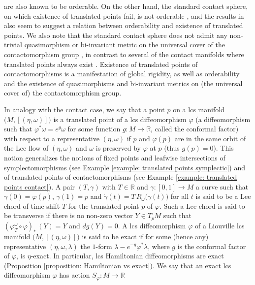 \documentclass{amsart}
\theoremstyle{remark}
\begin{document}
are also known to be orderable.
On the other hand,
the standard contact sphere,
on which existence of translated points fail,
is not orderable \cite{EKP},
and the results in \cite{HS, AArl}
also seem to suggest a relation between orderability
and existence of translated points.
We also note that the standard contact sphere
does not admit any non-trivial quasimorphism
or bi-invariant metric on the universal cover
of the contactomorphism group \cite{FPR},
in contrast to several of the contact manifolds
where translated points always exist
\cite{San10, CS, Givental, GKPS, FPR, BZ}.
Existence of translated points of contactomorphisms
is a manifestation of global rigidity,
as well as orderability and the existence of quasimorphisms
and bi-invariant metrics on (the universal cover of) the contactomorphism group.

In analogy with the contact case,
we say that a point $p$ on a lcs manifold $\big( M , [(\eta, \omega)] \big)$
is a translated point of a lcs diffeomorphism $\varphi$
(a diffeomorphism such that $\varphi^{\ast}\omega = e^g \omega$
for some function $g: M \rightarrow \mathbb{R}$,
called the conformal factor)
with respect to a representative $(\eta, \omega)$
if $p$ and $\varphi(p)$ are in the same orbit
of the Lee flow of $(\eta, \omega)$
and $\omega$ is preserved by $\varphi$ at $p$
(thus $g(p) = 0$).
This notion generalizes the notions of fixed points
and leafwise intersections of symplectomorphisms
(see Example \ref{example: translated points symplectic})
and of translated points of contactomorphisms
(see Example \ref{example: translated points contact}).
A pair $(T, \gamma)$ with $T \in \mathbb{R}$
and $\gamma: [0, 1] \rightarrow M$
a curve such that $\gamma(0) = \varphi (p)$,
$\gamma(1) = p$
and $\dot{\gamma} (t) = T \, R_{\omega} \big(\gamma(t)\big)$
for all $t$
is said to be a Lee chord of time-shift $T$
for the translated point $p$ of $\varphi$.
Such a Lee chord is said to be transverse 
if there is no non-zero vector $Y \in T_pM$
such that $(\varphi_T^{\omega} \circ \varphi)_{\ast} \, (Y) = Y$
and $dg (Y) = 0$.
A lcs diffeomorphism $\varphi$
of a Liouville lcs manifold $\big( M , [(\eta, \omega)] \big)$
is said to be exact
if for some (hence any) representative $(\eta, \omega, \lambda)$
the $1$-form $\lambda - e^{-g} \varphi^{\ast}\lambda$,
where $g$ is the conformal factor of $\varphi$,
is $\eta$-exact.
In particular, lcs Hamiltonian diffeomorphisms are exact
(Proposition \ref{proposition: Hamiltonian vs exact}).
We say that an exact lcs diffeomorphism
$\varphi$ has action $S_{\varphi}: M \rightarrow \mathbb{R}$
\end{document}
